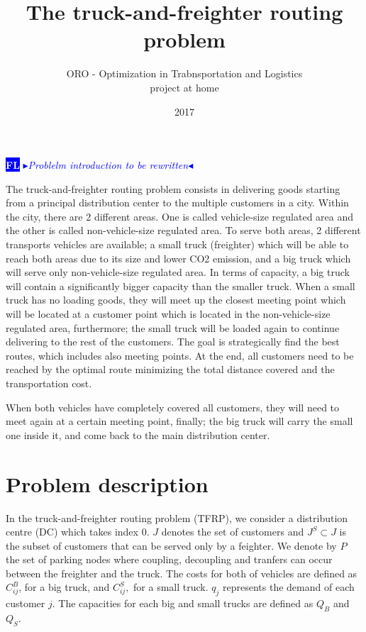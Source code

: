 \documentclass[dvipsnames,authoryear,11pt]{article}
\title{The truck-and-freighter routing problem}
\author{ORO - Optimization in Trabnsportation and Logistics \\
	project at home }
\date{2017}
\newcommand{\nb}[3]{
	{\colorbox{#2}{\bfseries\sffamily\scriptsize\textcolor{white}{#1}}}
	{\textcolor{#2}{\sf\small$\blacktriangleright$\textit{#3}$\blacktriangleleft$}}}
\newcommand{\FL}[1]{\nb{FL}{blue}{#1}}
\begin{document}
	
	\maketitle

		

\FL{Problelm introduction to be rewritten}

The truck-and-freighter routing problem consists in delivering goods starting from a principal distribution center to the multiple customers in a city. Within the city, there are 2 different areas. One is called vehicle-size regulated area and the other is called non-vehicle-size regulated area. To serve both areas, 2 different transports vehicles are available; a small truck (freighter) which will be able to reach both areas due to its size and lower CO2 emission, and a big truck which will serve only non-vehicle-size regulated area. In terms of capacity, a big truck will contain a significantly bigger capacity than the smaller truck. 
When a small truck has no loading goods, they will meet up the closest meeting point which will be located at a customer point which is located in the non-vehicle-size regulated area, furthermore; the small truck will be loaded again to continue delivering to the rest of the customers. The goal is strategically find the best routes, which includes also meeting points. At the end, all customers need to be reached by the optimal route minimizing the total distance covered and the transportation cost. 
	
	When both vehicles have completely covered all customers, they will need to meet again at a certain meeting point, finally; the big truck will carry the small one inside it, and come back to the main distribution center.
	

	
	\section{Problem description}
	
	In the truck-and-freighter routing problem (TFRP), we consider a distribution centre (DC) which takes index $0$.
	$J$ denotes the set of customers and $J^S \subset J$  is the subset of customers that can be served only by a feighter. 
	We denote by $P$ the set of parking nodes where coupling, decoupling and tranfers can occur between the freighter and the truck.
	The costs for both of vehicles are defined as $C_{ij}^B$, for a big truck, and $C_{ij}^S,$ for a small truck. $q_j$ represents the demand of each customer $j$. The capacities for each big and small trucks are defined as $Q_B$ and $Q_S$. 
	
\end{document}
